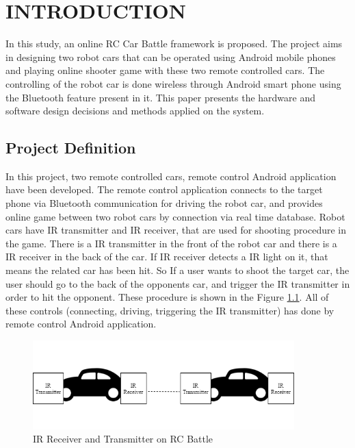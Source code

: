 \chapter{INTRODUCTION}
In this study, an online RC Car Battle framework is proposed. The project aims in designing two robot cars that can be operated using Android mobile phones and playing online shooter game with these two remote controlled cars. The controlling of the robot car is done wireless through Android smart phone using the Bluetooth feature present in it. This paper presents the hardware and software design decisions and methods applied on the system. \\

\section{Project Definition}

In this project, two remote controlled cars, remote control Android application have been developed. The remote control application connects to the target phone via Bluetooth communication for driving the robot car, and provides online game between two robot cars by connection via real time database. Robot cars have IR transmitter and IR receiver, that are used for shooting procedure in the game. There is a IR transmitter in the front of the robot car and there is a IR receiver in the back of the car. If IR receiver detects a IR light on it, that means the related car has been hit. So If a user wants to shoot the target car, the user should go to the back of the opponents car, and trigger the IR transmitter in order to hit the opponent. These procedure is shown in the Figure \ref{fig:frog}. All of these controls (connecting, driving, triggering the IR transmitter) has done by remote control Android application.

\begin{figure}[!htbp]
    \centering
    \includegraphics[width=0.9\textwidth]{Imgs/ir_diagram.png}
    \caption{\label{fig:frog}IR Receiver and Transmitter on RC Battle}
\end{figure}

